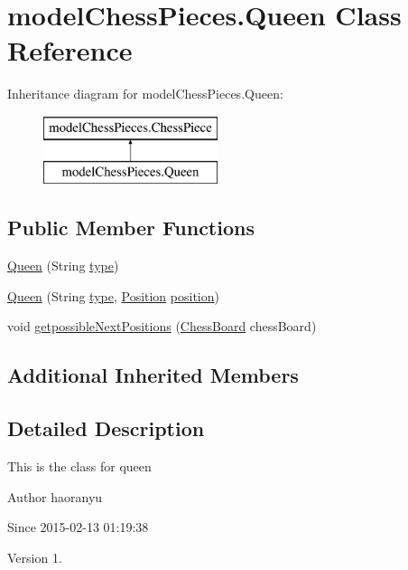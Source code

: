 \hypertarget{classmodel_chess_pieces_1_1_queen}{\section{model\+Chess\+Pieces.\+Queen Class Reference}
\label{classmodel_chess_pieces_1_1_queen}
}
Inheritance diagram for model\+Chess\+Pieces.\+Queen\+:\begin{figure}[H]
\begin{center}
\leavevmode
\includegraphics[height=2.000000cm]{classmodel_chess_pieces_1_1_queen}
\end{center}
\end{figure}
\subsection*{Public Member Functions}
\begin{DoxyCompactItemize}
\item 
\hyperlink{classmodel_chess_pieces_1_1_queen_a7b704ff103b506b01303c9acfc777240}{Queen} (String \hyperlink{classmodel_chess_pieces_1_1_chess_piece_a195487ca88c197af7c1604247be31db2}{type})
\item 
\hyperlink{classmodel_chess_pieces_1_1_queen_a020aae1c181f51bf9a587c35ff7388c4}{Queen} (String \hyperlink{classmodel_chess_pieces_1_1_chess_piece_a195487ca88c197af7c1604247be31db2}{type}, \hyperlink{classmodel_core_1_1_position}{Position} \hyperlink{classmodel_chess_pieces_1_1_chess_piece_a3d4362d5b28f6edb14161196d9c6807d}{position})
\item 
void \hyperlink{classmodel_chess_pieces_1_1_queen_a274ce1ba1eedee3d063ffc50caaf8539}{getpossible\+Next\+Positions} (\hyperlink{classmodel_core_1_1_chess_board}{Chess\+Board} chess\+Board)
\end{DoxyCompactItemize}
\subsection*{Additional Inherited Members}


\subsection{Detailed Description}
This is the class for queen \begin{DoxyAuthor}{Author}
haoranyu 
\end{DoxyAuthor}
\begin{DoxySince}{Since}
2015-\/02-\/13 01\+:19\+:38 
\end{DoxySince}
\begin{DoxyVersion}{Version}
1. 
\end{DoxyVersion}


